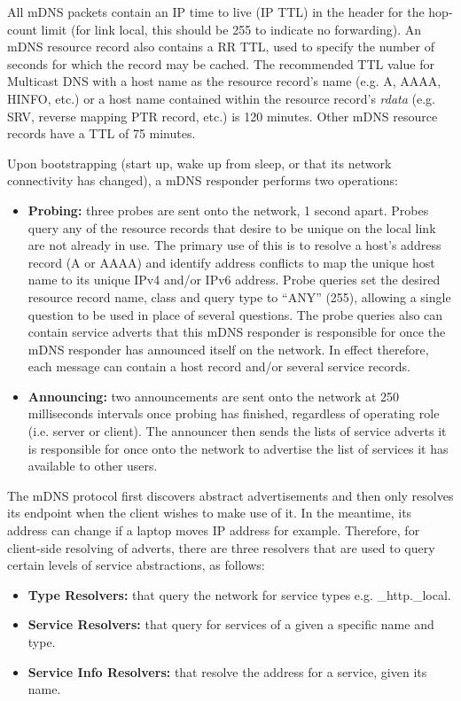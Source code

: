 All mDNS packets contain an IP time to live (IP TTL) in the header for the hop-count limit (for link local, this should be 255 to indicate no forwarding).   An mDNS resource record also contains a RR TTL,  used to specify the  number of seconds for which the record may be cached.   The recommended TTL value for Multicast DNS with a host name as the resource record's name (e.g. A, AAAA, HINFO, etc.) or a host name contained within the resource  record's  \emph{rdata} (e.g. SRV, reverse mapping PTR record, etc.) is 120 minutes.   Other mDNS resource records have a TTL of 75 minutes.


Upon bootstrapping (start up, wake up from sleep, or that its network connectivity has changed), a mDNS responder performs two operations:  

\begin{itemize}
\item \textbf{Probing:}  three probes are sent onto the network, 1 second apart.  Probes query any of the resource records that desire to be unique on the local link are not already in use.  The primary use of this is to resolve a host's address record (A or AAAA) and identify address conflicts to map the unique host name to its unique IPv4 and/or IPv6 address.  Probe queries set the desired resource record name, class and query type to ``ANY'' (255), allowing a single question to be used in place of several questions. The probe queries also can contain service adverts that this mDNS responder is responsible for once the mDNS responder has announced itself on the network. In effect therefore, each message can contain a host record and/or several service records. 
\item   \textbf{Announcing:}  two announcements  are sent onto the network at 250 milliseconds intervals once probing has finished, regardless of operating role (i.e. server or client).  The announcer then sends the lists of service adverts it is responsible for once onto the network to advertise the list of services it has available to other users.  
\end{itemize}

The mDNS protocol first discovers abstract advertisements and then only resolves its endpoint when the client wishes to make use of it.  In the meantime, its address can change if a laptop moves IP address for example. Therefore, for client-side resolving of adverts, there are three resolvers that are used to query certain levels of service abstractions, as follows:

\begin{itemize}

 \item \textbf{Type Resolvers:}  that query the network for service types e.g. \_http.\_local.

\item \textbf{Service Resolvers:} that query for services of a given a specific name and type.
 
\item \textbf{Service Info Resolvers:} that resolve the address for a service, given its name.
\end{itemize}

